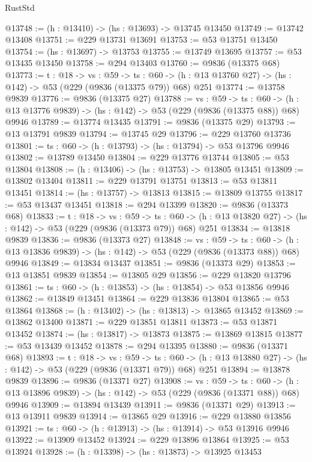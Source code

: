 \begin{lexlean}{RustStd}
\begin{coremodule}
@13748 := (h : @13410) -> (hs : @13693) -> @13745 @13450
@13749 := @13742 @13408
@13751 := @229 @13731 @13691
@13753 := @53 @13751 @13450
@13754 := (hs : @13697) -> @13753
@13755 := @13749 @13695
@13757 := @53 @13435 @13450
@13758 := @294 @13403
@13760 := @9836 (@13375 @68)
@13773 := {t : @18} ->
  {vs : @59} ->
  {ts : @60} -> (h : @13 @13760 @27) -> (hs : @142) -> @53 (@229 (@9836 (@13375 @79)) @68) @251
@13774 := @13758 @9839
@13776 := @9836 (@13375 @27)
@13788 := {vs : @59} ->
  {ts : @60} -> (h : @13 @13776 @9839) -> (hs : @142) -> @53 (@229 (@9836 (@13375 @88)) @68) @9946
@13789 := @13774 @13435
@13791 := @9836 (@13375 @29)
@13793 := @13 @13791 @9839
@13794 := @13745 @29
@13796 := @229 @13760 @13736
@13801 := {ts : @60} -> (h : @13793) -> (hs : @13794) -> @53 @13796 @9946
@13802 := @13789 @13450
@13804 := @229 @13776 @13744
@13805 := @53 @13804
@13808 := (h : @13406) -> (hs : @13753) -> @13805 @13451
@13809 := @13802 @13404
@13811 := @229 @13791 @13751
@13813 := @53 @13811 @13451
@13814 := (hs : @13757) -> @13813
@13815 := @13809 @13755
@13817 := @53 @13437 @13451
@13818 := @294 @13399
@13820 := @9836 (@13373 @68)
@13833 := {t : @18} ->
  {vs : @59} ->
  {ts : @60} -> (h : @13 @13820 @27) -> (hs : @142) -> @53 (@229 (@9836 (@13373 @79)) @68) @251
@13834 := @13818 @9839
@13836 := @9836 (@13373 @27)
@13848 := {vs : @59} ->
  {ts : @60} -> (h : @13 @13836 @9839) -> (hs : @142) -> @53 (@229 (@9836 (@13373 @88)) @68) @9946
@13849 := @13834 @13437
@13851 := @9836 (@13373 @29)
@13853 := @13 @13851 @9839
@13854 := @13805 @29
@13856 := @229 @13820 @13796
@13861 := {ts : @60} -> (h : @13853) -> (hs : @13854) -> @53 @13856 @9946
@13862 := @13849 @13451
@13864 := @229 @13836 @13804
@13865 := @53 @13864
@13868 := (h : @13402) -> (hs : @13813) -> @13865 @13452
@13869 := @13862 @13400
@13871 := @229 @13851 @13811
@13873 := @53 @13871 @13452
@13874 := (hs : @13817) -> @13873
@13875 := @13869 @13815
@13877 := @53 @13439 @13452
@13878 := @294 @13395
@13880 := @9836 (@13371 @68)
@13893 := {t : @18} ->
  {vs : @59} ->
  {ts : @60} -> (h : @13 @13880 @27) -> (hs : @142) -> @53 (@229 (@9836 (@13371 @79)) @68) @251
@13894 := @13878 @9839
@13896 := @9836 (@13371 @27)
@13908 := {vs : @59} ->
  {ts : @60} -> (h : @13 @13896 @9839) -> (hs : @142) -> @53 (@229 (@9836 (@13371 @88)) @68) @9946
@13909 := @13894 @13439
@13911 := @9836 (@13371 @29)
@13913 := @13 @13911 @9839
@13914 := @13865 @29
@13916 := @229 @13880 @13856
@13921 := {ts : @60} -> (h : @13913) -> (hs : @13914) -> @53 @13916 @9946
@13922 := @13909 @13452
@13924 := @229 @13896 @13864
@13925 := @53 @13924
@13928 := (h : @13398) -> (hs : @13873) -> @13925 @13453

\end{coremodule}
\end{lexlean}

